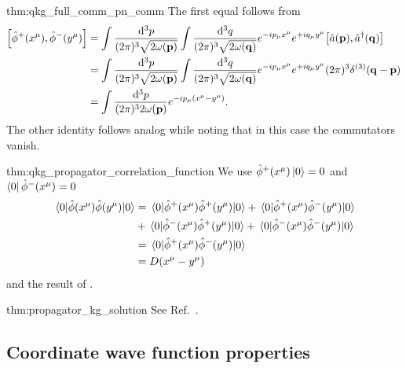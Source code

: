\begin{delayedproof}{thm:qkg_full_comm_pn_comm}
	The first equal follows from
	\begin{equation*}
		\begin{split}
			\comm{\hat\phi^+(x^\mu)}{\hat\phi^-(y^\mu)}
			&=
			\int\frac{\dd[3]{p}}{(2\pi)^3\sqrt{2\omega(\vb{p})}}
			\int\frac{\dd[3]{q}}{(2\pi)^3\sqrt{2\omega(\vb{q})}}
			e^{-ip_\mu x^\mu}
			e^{+iq_\mu y^\mu}
			\comm{\hat{a}(\vb{p})}{\hat{a}^\dagger(\vb{q})}
			\\
			&=
			\int\frac{\dd[3]{p}}{(2\pi)^3\sqrt{2\omega(\vb{p})}}
			\int\frac{\dd[3]{q}}{(2\pi)^3\sqrt{2\omega(\vb{q})}}
			e^{-ip_\mu x^\mu}
			e^{+iq_\mu y^\mu}
			(2\pi)^3
			\delta^{(3)}(\vb{q}-\vb{p})
			\\
			&=
			\int\frac{\dd[3]{p}}{(2\pi)^32\omega(\vb{p})}
			e^{-ip_\mu (x^\mu-y^\mu)}
			.
		\end{split}
	\end{equation*}
	The other identity follows analog while noting that in this case the commutators vanish.
\end{delayedproof}
\begin{delayedproof}{thm:qkg_propagator_correlation_function}
	We use $\hat\phi^+(x^\mu)\ket{0}=0$ and $\bra{0}\hat\phi^-(x^\mu)=0$
	\begin{equation*}
		\begin{split}
			\expval{\hat\phi(x^\mu)\hat\phi(y^\mu)}{0}
			&=
			\expval{\hat\phi^+(x^\mu)\hat\phi^+(y^\mu)}{0}
			+
			\expval{\hat\phi^+(x^\mu)\hat\phi^-(y^\mu)}{0}
			\\
			&+
			\expval{\hat\phi^-(x^\mu)\hat\phi^+(y^\mu)}{0}
			+
			\expval{\hat\phi^-(x^\mu)\hat\phi^-(y^\mu)}{0}
			\\
			&=
			\expval{\hat\phi^+(x^\mu)\hat\phi^-(y^\mu)}{0}
			\\
			&=
			D(x^\mu-y^\mu)
		\end{split}	
	\end{equation*}
	and the result of .
\end{delayedproof}
\begin{delayedproof}{thm:propagator_kg_solution}
	See Ref.~\cite[p.~30]{Peskin1995}.
\end{delayedproof}

\subsection{Coordinate wave function properties}


